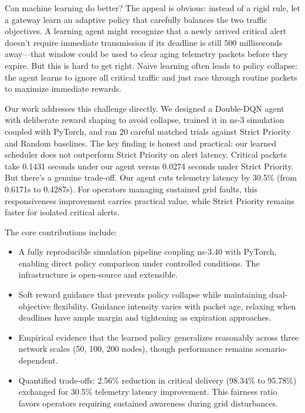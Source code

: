 \documentclass[runningheads,a4paper]{llncs}
\begin{document}
Can machine learning do better? The appeal is obvious: instead of a rigid rule, let a gateway learn an adaptive policy that carefully balances the two traffic objectives. A learning agent might recognize that a newly arrived critical alert doesn't require immediate transmission if its deadline is still 500 milliseconds away---that window could be used to clear aging telemetry packets before they expire. But this is hard to get right. Naive learning often leads to policy collapse: the agent learns to ignore all critical traffic and just race through routine packets to maximize immediate rewards.

Our work addresses this challenge directly. We designed a Double-DQN agent with deliberate reward shaping to avoid collapse, trained it in ns-3 simulation coupled with PyTorch, and ran 20 careful matched trials against Strict Priority and Random baselines. The key finding is honest and practical: our learned scheduler does not outperform Strict Priority on alert latency. Critical packets take 0.1431 seconds under our agent versus 0.0274 seconds under Strict Priority. But there's a genuine trade-off. Our agent cuts telemetry latency by 30.5\% (from 0.6171s to 0.4287s). For operators managing sustained grid faults, this responsiveness improvement carries practical value, while Strict Priority remains faster for isolated critical alerts. 

The core contributions include:
\begin{itemize}
    \item A fully reproducible simulation pipeline coupling ns-3.40 with PyTorch, enabling direct policy comparison under controlled conditions. The infrastructure is open-source and extensible.
    \item Soft reward guidance that prevents policy collapse while maintaining dual-objective flexibility. Guidance intensity varies with packet age, relaxing when deadlines have ample margin and tightening as expiration approaches.
    \item Empirical evidence that the learned policy generalizes reasonably across three network scales (50, 100, 200 nodes), though performance remains scenario-dependent.
    \item Quantified trade-offs: 2.56\% reduction in critical delivery (98.34\% to 95.78\%) exchanged for 30.5\% telemetry latency improvement. This fairness ratio favors operators requiring sustained awareness during grid disturbances.
\end{itemize}
\end{document}

